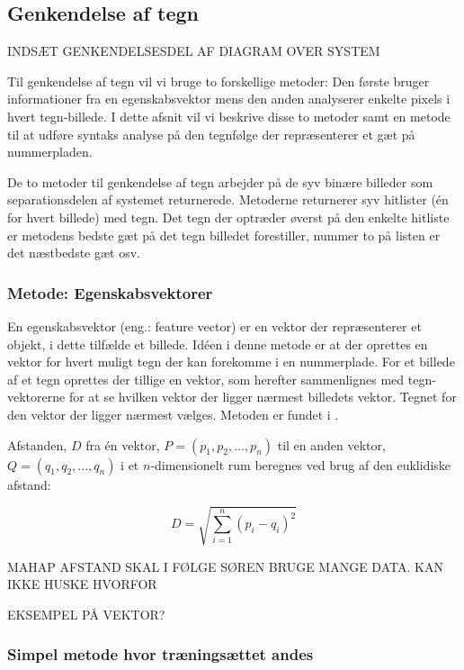 \subsection{Genkendelse af tegn}

INDSÆT GENKENDELSESDEL AF DIAGRAM OVER SYSTEM
\label{sec_monster}

Til genkendelse af tegn vil vi bruge to forskellige metoder: Den første bruger informationer fra en egenskabsvektor mens den anden analyserer enkelte pixels i hvert tegn-billede. I dette afsnit vil vi beskrive disse to metoder samt en metode til at udføre syntaks analyse på den tegnfølge der repræsenterer et gæt på nummerpladen.

De to metoder til genkendelse af tegn arbejder på de syv binære billeder som separationsdelen af systemet returnerede. Metoderne returnerer syv hitlister (én for hvert billede) med tegn. Det tegn der optræder øverst på den enkelte hitliste er metodens bedste gæt på det tegn billedet forestiller, nummer to på listen er det næstbedste gæt osv.

\subsubsection{Metode: Egenskabsvektorer}
En egenskabsvektor (eng.: feature vector) er en vektor der repræsenterer et objekt, i dette tilfælde et billede. Idéen i denne metode er at der oprettes en vektor for hvert muligt tegn der kan forekomme i en nummerplade. For et billede af et tegn oprettes der tillige en vektor, som herefter sammenlignes med tegn-vektorerne for at se hvilken vektor der ligger nærmest billedets vektor. Tegnet for den vektor der ligger nærmest vælges. Metoden er fundet i \cite{arth}.

Afstanden, $D$ fra én vektor, $P = (p_{1},p_{2},...,p_{n})$ til en anden vektor, $Q = (q_{1},q_{2},...,q_{n})$ i et $n$-dimensionelt rum beregnes ved brug af den euklidiske afstand\cite{wiki_euclid}:

\begin{displaymath}
	D = \sqrt{\sum_{i=1}^{n}(p_{i}-q_{i})^{2}}
\end{displaymath}

MAHAP AFSTAND SKAL I FØLGE SØREN BRUGE MANGE DATA. KAN IKKE HUSKE HVORFOR

EKSEMPEL PÅ VEKTOR?

\subsubsection{Simpel metode hvor træningsættet andes}

